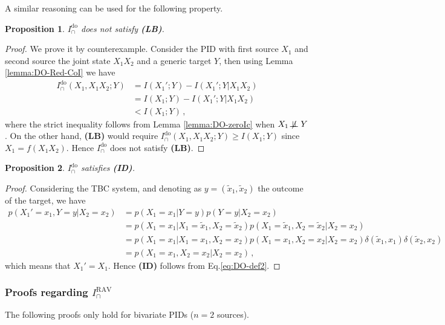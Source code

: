 \documentclass{article}
\newcommand{\notind}{\mathrel{\not\!\perp\!\!\!\perp}}
\newcommand{\ID}{\textbf{(ID)}\xspace} %
\newcommand{\LB}{\textbf{(LB)}\xspace} %
\newcommand{\Ido}{\ensuremath{I_\cap^{\text{do}}}\xspace}
\newcommand{\IRAV}{\ensuremath{I_\cap^{\text{RAV}}}\xspace}
\newtheorem{proposition}{Proposition}
\begin{document}
A similar reasoning can be used for the following property.
\begin{proposition} \label{prop:DO-noLB}
    $\Ido$ does not satisfy \LB.
\end{proposition}
\begin{proof}
     We prove it by counterexample. Consider the PID with first source $X_1$ and second source the joint state $X_1 X_2$ and a generic target $Y$, then using Lemma \ref{lemma:DO-Red-CoI} we have
     \begin{equation}
     \begin{aligned}
         \Ido(X_1,X_1X_2;Y) & = I(X_1';Y) - I(X_1';Y|X_1X_2) \\
         & = I(X_1;Y) - I(X_1';Y|X_1X_2) \\
         & < I(X_1;Y) \,,
        \end{aligned}
    \end{equation}
    where the strict inequality follows from Lemma \ref{lemma:DO-zeroIc} when $X_1\notind Y$. On the other hand, \LB would require $\Ido(X_1,X_1X_2;Y)\geq I(X_1;Y)$ since $X_1=f(X_1 X_2)$. Hence $\Ido$ does not satisfy \LB.
\end{proof}

\begin{proposition} \label{prop:DO-ID}
    \Ido satisfies \ID.
\end{proposition}
\begin{proof}
    Considering the TBC system, and denoting as $y=(\tilde{x}_1,\tilde{x}_2)$ the outcome of the target, we have
    \begin{equation}
    \begin{aligned}
        p(X_1'=x_1,Y=y|X_2=x_2) & = p(X_1=x_1|Y=y)p(Y=y|X_2=x_2) \\
        & = p(X_1=x_1|X_1=\tilde{x}_1, X_2=\tilde{x}_2)p(X_1=\tilde{x}_1, X_2=\tilde{x}_2|X_2=x_2) \\
        & = p(X_1=x_1|X_1=x_1, X_2=x_2)p(X_1=x_1, X_2=x_2|X_2=x_2) \delta(\tilde{x}_1,x_1)\delta(\tilde{x}_2,x_2) \\
        & = p(X_1=x_1, X_2=x_2|X_2=x_2) \,,
    \end{aligned}
    \end{equation}
    which means that $X_1'=X_1$. Hence \ID follows from Eq.\eqref{eq:DO-def2}.
\end{proof}


\subsubsection{Proofs regarding \IRAV}
The following proofs only hold for bivariate PIDs ($n=2$ sources).
\end{document}
